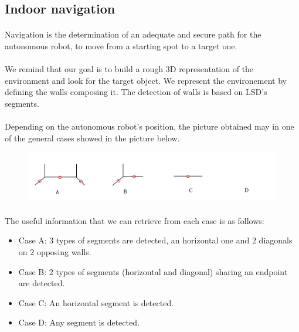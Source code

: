 \documentclass[12pt]{report}
\begin{document}
    \subsection{Indoor navigation}
    \paragraph{}
    Navigation is the determination of an adequate and secure path for the autonomous robot, to move from a starting spot to a target one. 
    \paragraph{}
    We remind that our goal is to build a rough 3D representation of the environment and look for the target object. We represent the environement by defining the walls composing it. The detection of walls is based on LSD's segments. 
    
    \paragraph{}
    Depending on the autonomous robot's position, the picture obtained may in one of the general cases showed in the picture below. 
    
    
    	\begin{figure}[H]
    	\begin{center}
    		\includegraphics[scale=0.6]{res/cases_seg.png}
    	\end{center}
    \end{figure}
 \paragraph{}
 The useful information that we can retrieve from each case is as follows:
 \begin{itemize}
 	\item Case A: 3 types of segments are detected, an horizontal one and 2 diagonals on 2 opposing walls.
 	\item Case B: 2 types of segments (horizontal and diagonal) sharing an endpoint are detected.
 	\item Case C: An horizontal segment is detected.
 	\item Case D: Any segment is detected.
 	
 \end{itemize}
\end{document}
